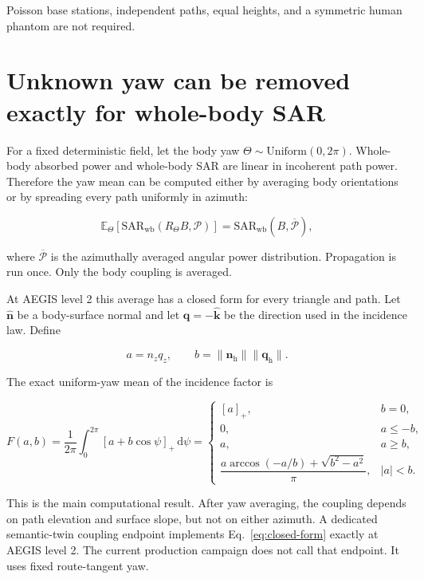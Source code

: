 \documentclass[11pt]{article}
\newcommand{\ReLU}[1]{\left[#1\right]_{+}}
\newcommand{\SARwb}{\mathrm{SAR}_{\mathrm{wb}}}
\begin{document}
Poisson base stations, independent paths, equal heights, and a symmetric human
phantom are not required.

\section{Unknown yaw can be removed exactly for whole-body SAR}

For a fixed deterministic field, let the body yaw
$\Theta\sim\mathrm{Uniform}(0,2\pi)$. Whole-body absorbed power and whole-body
SAR are linear in incoherent path power. Therefore the yaw mean can be computed
either by averaging body orientations or by spreading every path uniformly in
azimuth:

\begin{equation}\label{eq:yaw-average}
  \mathbb{E}_{\Theta}
  \left[\SARwb(R_\Theta B,\mathcal{P})\right]
  =
  \SARwb(B,\overline{\mathcal{P}}),
\end{equation}

where $\overline{\mathcal{P}}$ is the azimuthally averaged angular power
distribution. Propagation is run once. Only the body coupling is averaged.

At AEGIS level 2 this average has a closed form for every triangle and path.
Let $\widehat{\mathbf{n}}$ be a body-surface normal and let
$\mathbf{q}=-\widehat{\mathbf{k}}$ be the direction used in the incidence law.
Define

\begin{equation}
  a=n_zq_z,
  \qquad
  b=\lVert\mathbf{n}_{\mathrm{h}}\rVert
    \lVert\mathbf{q}_{\mathrm{h}}\rVert.
\end{equation}

The exact uniform-yaw mean of the incidence factor is

\begin{equation}\label{eq:closed-form}
  F(a,b)=
  \frac{1}{2\pi}\int_0^{2\pi}\ReLU{a+b\cos\psi}\,\mathrm{d}\psi
  =
  \begin{cases}
    \ReLU{a}, & b=0,\\
    0, & a\leq-b,\\
    a, & a\geq b,\\
    \dfrac{a\arccos(-a/b)+\sqrt{b^2-a^2}}{\pi}, & |a|<b.
  \end{cases}
\end{equation}

This is the main computational result. After yaw averaging, the coupling
depends on path elevation and surface slope, but not on either azimuth. A
dedicated semantic-twin coupling endpoint implements
Eq.~\eqref{eq:closed-form} exactly at AEGIS level 2. The current production
campaign does not call that endpoint. It uses fixed route-tangent yaw.
\end{document}
